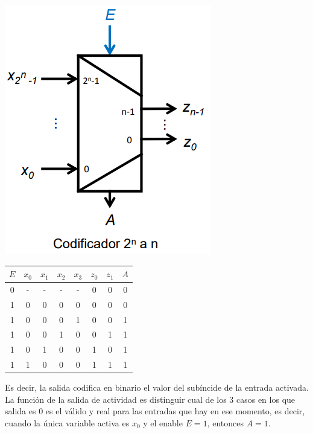 \documentclass[a4paper,10pt]{book}
\begin{document}
\begin{multicols}{2}

\begin{center}
\includegraphics[scale=0.65]{codificador}
\end{center}

\begin{center}
\begin{tabular}{|c|c|c|c|c|c|c|c|}
\hline
$E$ & $x_0$ & $x_1$ & $x_2$ & $x_3$& $z_0$ & $z_1$ & $A$ \\
\hline
0 & - & - & - & - & 0 & 0 & 0 \\
\hline
1 & 0 & 0 & 0 & 0 & 0 & 0 & 0 \\
\hline
1 & 0 & 0 & 0 & 1 & 0 & 0 & 1 \\
\hline
1 & 0 & 0 & 1 & 0 & 0 & 1 & 1 \\
\hline
1 & 0 & 1 & 0 & 0 & 1 & 0 & 1 \\
\hline
1 & 1 & 0 & 0 & 0 & 1 & 1 & 1 \\
\hline
\end{tabular}
\end{center}
\end{multicols}

Es decir, la salida codifica en binario el valor del subíncide de la entrada activada. La función de la salida de actividad es distinguir cual de los 3 casos en los que salida es 0 es el válido y real para las entradas que hay en ese momento, es decir, cuando la única variable activa es $x_0$ y el enable $E=1$, entonces $A=1$.
\end{document}
